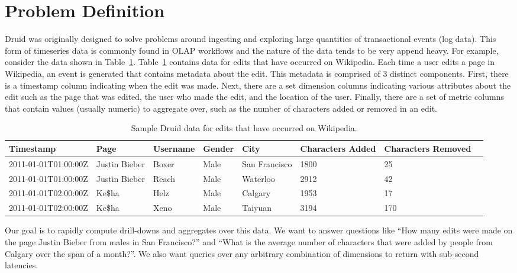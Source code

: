 \documentclass{acm_proc_article-sp}
\begin{document}
\section{Problem Definition}
\label{sec:problem-definition}

Druid was originally designed to solve problems around ingesting and exploring
large quantities of transactional events (log data). This form of timeseries data is
commonly found in OLAP workflows and the nature of the data tends to be very
append heavy. For example, consider the data shown in
Table~\ref{tab:sample_data}.  Table~\ref{tab:sample_data} contains data for
edits that have occurred on Wikipedia. Each time a user edits a page in
Wikipedia, an event is generated that contains metadata about the edit. This
metadata is comprised of 3 distinct components. First, there is a timestamp
column indicating when the edit was made. Next, there are a set dimension
columns indicating various attributes about the edit such as the page that was
edited, the user who made the edit, and the location of the user. Finally,
there are a set of metric columns that contain values (usually numeric) to
aggregate over, such as the number of characters added or removed in an edit. 

\begin{table}
  \centering
  \caption{Sample Druid data for edits that have occurred on Wikipedia.}
  \label{tab:sample_data}
  \begin{tabular}{| l | l | l | l | l | l | l | l |}
    \hline
    \textbf{Timestamp} & \textbf{Page} & \textbf{Username} & \textbf{Gender} & \textbf{City} & \textbf{Characters Added} & \textbf{Characters Removed} \\ \hline
    2011-01-01T01:00:00Z & Justin Bieber & Boxer & Male & San Francisco & 1800 & 25 \\ \hline
    2011-01-01T01:00:00Z & Justin Bieber & Reach & Male & Waterloo & 2912 & 42 \\ \hline
    2011-01-01T02:00:00Z & Ke\$ha & Helz & Male & Calgary & 1953 & 17 \\ \hline
    2011-01-01T02:00:00Z & Ke\$ha & Xeno & Male & Taiyuan & 3194 & 170 \\ \hline
  \end{tabular}
\end{table}

Our goal is to rapidly compute drill-downs and aggregates over this data. We
want to answer questions like “How many edits were made on the page Justin
Bieber from males in San Francisco?” and “What is the average number of
characters that were added by people from Calgary over the span of a month?”. We also
want queries over any arbitrary combination of dimensions to return with
sub-second latencies.
\end{document}
